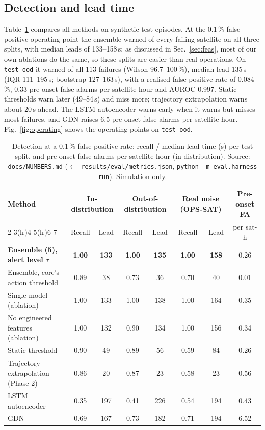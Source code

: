 \documentclass[conference]{IEEEtran}
\newcommand{\file}[1]{\texttt{#1}}
\begin{document}
\subsection{Detection and lead time}
Table~\ref{tab:detect} compares all methods on synthetic test episodes. At the 0.1\,\% false-positive
operating point the ensemble warned of every failing satellite on all three splits, with median leads
of 133--158\,s; as discussed in Sec.~\ref{sec:feas}, most of our own ablations do the same, so these
splits are easier than real operations. On
\texttt{test\_ood} it warned of all 113 failures (Wilson 96.7--100\,\%), median lead 135\,s (IQR
111--195\,s; bootstrap 127--163\,s), with a realised false-positive rate of 0.084\,\%, 0.33 pre-onset
false alarms per satellite-hour and AUROC 0.997. Static thresholds warn later (49--84\,s) and miss more;
trajectory extrapolation warns about 20\,s ahead. The LSTM autoencoder warns early when it warns but
misses most failures, and GDN raises 6.5 pre-onset false alarms per satellite-hour.
Fig.~\ref{fig:operating} shows the operating points on \texttt{test\_ood}.

\begin{table}[t]
\caption{Detection at a 0.1\,\% false-positive rate: recall / median lead time (s) per test split, and
pre-onset false alarms per satellite-hour (in-distribution). Source: \file{docs/NUMBERS.md}
($\leftarrow$ \file{results/eval/metrics.json}, \texttt{python -m eval.harness run}). Simulation only.}
\label{tab:detect}
\centering
\begin{tabular}{@{}lccccccc@{}}
\toprule
\multirow{2}{*}{Method} & \multicolumn{2}{c}{In-distribution} & \multicolumn{2}{c}{Out-of-distribution}
& \multicolumn{2}{c}{Real noise (OPS-SAT)} & Pre-onset FA \\
\cmidrule(lr){2-3}\cmidrule(lr){4-5}\cmidrule(lr){6-7}
& Recall & Lead & Recall & Lead & Recall & Lead & per sat-h \\
\midrule
\textbf{Ensemble (5), alert level $\tau$} & \textbf{1.00} & \textbf{133} & \textbf{1.00} & \textbf{135} & \textbf{1.00} & \textbf{158} & 0.26 \\
Ensemble, core's action threshold & 0.89 & 38 & 0.73 & 36 & 0.70 & 40 & 0.01 \\
Single model (ablation) & 1.00 & 133 & 1.00 & 138 & 1.00 & 164 & 0.35 \\
No engineered features (ablation) & 1.00 & 132 & 0.90 & 134 & 1.00 & 156 & 0.34 \\
Static threshold & 0.90 & 49 & 0.89 & 56 & 0.59 & 84 & 0.26 \\
Trajectory extrapolation (Phase 2) & 0.86 & 20 & 0.87 & 23 & 0.58 & 23 & 0.56 \\
LSTM autoencoder & 0.35 & 197 & 0.41 & 226 & 0.54 & 194 & 0.43 \\
GDN & 0.69 & 167 & 0.73 & 182 & 0.71 & 194 & 6.52 \\
\bottomrule
\end{tabular}
\end{table}
\end{document}
